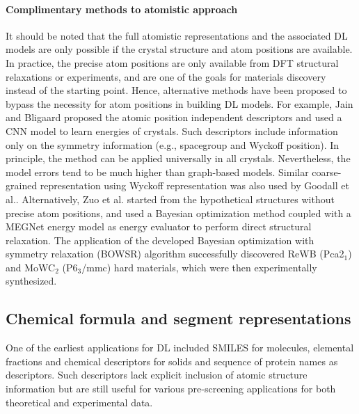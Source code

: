 \documentclass[pdflatex,sn-mathphys]{sn-jnl}%
\theoremstyle{thmstyleone}%
\theoremstyle{thmstyletwo}%
\theoremstyle{thmstylethree}%
\begin{document}
 \paragraph{Complimentary methods to atomistic approach}
It should be noted that the full atomistic representations and the associated DL models are only possible if the crystal structure and atom positions are available. In practice, the precise atom positions are only available from DFT structural relaxations or experiments, and are one of the goals for materials discovery instead of the starting point. Hence, alternative methods have been proposed to bypass the necessity for atom positions in building DL models. For example, Jain and Bligaard \cite{jainAtomicpositionIndependentDescriptor2018} proposed the atomic position independent descriptors and used a CNN model to learn energies of crystals. Such descriptors include information only on the symmetry information (e.g., spacegroup and Wyckoff position). In principle, the method can be applied universally in all crystals. Nevertheless, the model errors tend to be much higher than graph-based models. Similar coarse-grained representation using Wyckoff representation was also used by Goodall et al.\cite{goodall2021rapid}. Alternatively, Zuo et al.\cite{zuoAcceleratingMaterialsDiscovery2021} started from the hypothetical structures without precise atom positions, and used a Bayesian optimization method coupled with a MEGNet energy model as energy evaluator to perform direct structural relaxation. The application of the developed Bayesian optimization with symmetry relaxation (BOWSR) algorithm successfully discovered ReWB (Pca2$_1$) and MoWC$_2$ (P6$_3$/mmc) hard materials, which were then experimentally synthesized.











\subsection{Chemical formula and segment representations}\label{sec:stoichiometric}
One of the earliest applications for DL included SMILES for molecules, elemental fractions and chemical descriptors for solids and sequence of protein names as descriptors. Such descriptors lack explicit inclusion of atomic structure information but are still useful for various pre-screening applications for both theoretical and experimental data. 
\end{document}
